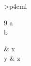 \documentclass{article}
\begin{document}
\begin{tabu}{>{\centering}p{4cm}l}
\begin{thebibliography}{9} a\\b\end{thebibliography} & x \\
y & z \\
\end{tabu}
\end{document}
